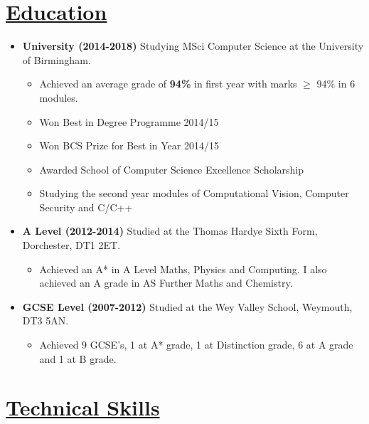\documentclass[11pt]{article}
\begin{document}
	\vspace{-30pt}
	\hspace{-100pt}\section*{\underline{Education}}
		\begin {itemize}
			\item \textbf{University (2014-2018)} Studying MSci Computer Science at the University of Birmingham.
				\begin{itemize}
					\item Achieved an average grade of\textbf{ 94\%} in first year with marks $\geq$ 94\% in 6 modules.
					\item Won Best in Degree Programme 2014/15
					\item Won BCS Prize for Best in Year 2014/15
					\item Awarded School of Computer Science Excellence Scholarship
					\item Studying the second year modules of Computational Vision, Computer Security and C/C++
				\end{itemize}
			\item \textbf{A Level (2012-2014)} Studied at the Thomas Hardye Sixth Form, Dorchester, DT1 2ET.
				\begin{itemize}
					\item Achieved an A* in A Level Maths, Physics and Computing. I also achieved an A grade in AS Further Maths and Chemistry.
				\end{itemize}
			
			\item \textbf{GCSE Level (2007-2012)}  Studied at the Wey Valley School, Weymouth, DT3 5AN. 
				\begin{itemize}
					\item Achieved 9 GCSE's, 1 at A* grade, 1 at Distinction grade, 6 at A grade and 1 at B grade.
				\end{itemize} 
		\end{itemize}
	\vspace{-20pt}
	\hspace{-100pt}\section*{\underline{Technical Skills}}
\end{document}
